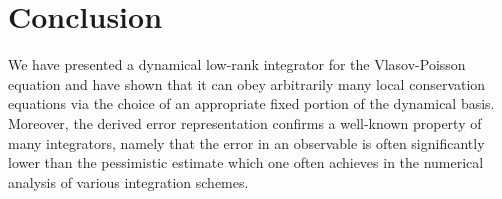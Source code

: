 
\section{Conclusion}\label{sec:conclusion}

We have presented a dynamical low-rank integrator for the Vlasov-Poisson equation 
and have shown that it can obey arbitrarily many local conservation equations via 
the choice of an appropriate fixed portion of the dynamical basis. Moreover, the 
derived error representation confirms a well-known property of many integrators, 
namely that the error in an observable is often significantly lower than the 
pessimistic estimate which one often achieves in the numerical analysis of various 
integration schemes. 

